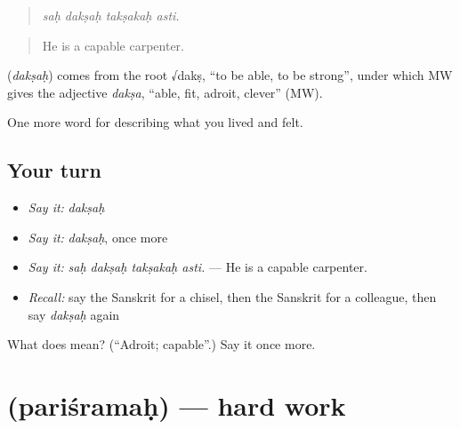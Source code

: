 \begin{quote}
   
\end{quote}

\begin{quote}
\emph{saḥ dakṣaḥ takṣakaḥ asti.}
\end{quote}

\begin{quote}
He is a capable carpenter.
\end{quote}

\begin{cousinweb}
\textbf{} (\emph{dakṣaḥ}) comes from the root √dakṣ, \textquotedblleft{}to be able, to be strong\textquotedblright{}, under which MW gives the adjective \emph{dakṣa}, \textquotedblleft{}able, fit, adroit, clever\textquotedblright{} (MW).
\end{cousinweb}

\begin{grammarlens}[title={What you've built}]
One more word for describing what you lived and felt.
\end{grammarlens}

\subsection*{Your turn}
\begin{itemize}
\raggedright
  \item \emph{Say it:} \emph{dakṣaḥ}
  \item \emph{Say it:} \emph{dakṣaḥ}, once more
  \item \emph{Say it:} \emph{saḥ dakṣaḥ takṣakaḥ asti.} — He is a capable carpenter.
  \item \emph{Recall:} say the Sanskrit for a chisel, then the Sanskrit for a colleague, then say \emph{dakṣaḥ} again
\end{itemize}

\begin{tcolorbox}[breakable,colback=teal!4,colframe=teal!35!black,title={Before you move on}]
What does  mean? (\textquotedblleft{}Adroit; capable\textquotedblright{}.) Say it once more.
\end{tcolorbox}
\section[\texorpdfstring{\sk{परिश्रमः} (pariśramaḥ)}{परिश्रमः (pariśramaḥ)}]{ (pariśramaḥ) — hard work}

\label{lesson:SA-C503-parisramah}



